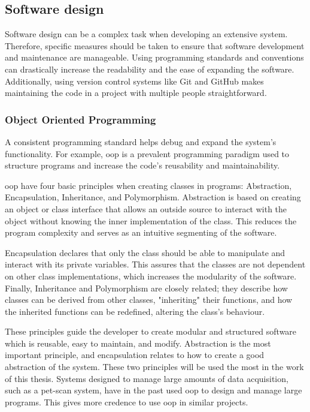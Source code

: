 \documentclass[main.tex]{subfiles}
\begin{document}
\subsection{Software design}

Software design can be a complex task when developing an extensive system. Therefore, specific measures should be taken to ensure that software development and maintenance are manageable. Using programming standards and conventions can drastically increase the readability and the ease of expanding the software. Additionally, using version control systems like Git and GitHub makes maintaining the code in a project with multiple people straightforward.

\subsubsection{Object Oriented Programming}

A consistent programming standard helps debug and expand the system's functionality. For example, \gls{oop} is a prevalent programming paradigm used to structure programs and increase the code's reusability and maintainability.

\gls{oop} have four basic principles when creating classes in programs: Abstraction, Encapsulation, Inheritance, and Polymorphism. Abstraction is based on creating an object or class interface that allows an outside source to interact with the object without knowing the inner implementation of the class. This reduces the program complexity and serves as an intuitive segmenting of the software.

Encapsulation declares that only the class should be able to manipulate and interact with its private variables. This assures that the classes are not dependent on other class implementations, which increases the modularity of the software. Finally, Inheritance and Polymorphism are closely related; they describe how classes can be derived from other classes, "inheriting" their functions, and how the inherited functions can be redefined, altering the class's behaviour.


These principles guide the developer to create modular and structured software which is reusable, easy to maintain, and modify. Abstraction is the most important principle, and encapsulation relates to how to create a good abstraction of the system. These two principles will be used the most in the work of this thesis. Systems designed to manage large amounts of data acquisition, such as a \gls{pet}-scan system, have in the past used \gls{oop} to design and manage large programs\cite{pet_control_system}. This gives more credence to use \gls{oop} in similar projects.
\end{document}
